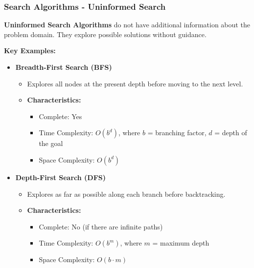 \documentclass[aspectratio=169]{beamer}
\begin{document}
\begin{frame}[fragile]
    \frametitle{Search Algorithms - Uninformed Search}
    \textbf{Uninformed Search Algorithms} do not have additional information about the problem domain. They explore possible solutions without guidance.

    \textbf{Key Examples:}
    
    \begin{itemize}
        \item \textbf{Breadth-First Search (BFS)}
        \begin{itemize}
            \item Explores all nodes at the present depth before moving to the next level.
            \item \textbf{Characteristics:}
            \begin{itemize}
                \item Complete: Yes
                \item Time Complexity: $O(b^d)$, where $b$ = branching factor, $d$ = depth of the goal
                \item Space Complexity: $O(b^d)$
            \end{itemize}
        \end{itemize}
        
        \item \textbf{Depth-First Search (DFS)}
        \begin{itemize}
            \item Explores as far as possible along each branch before backtracking.
            \item \textbf{Characteristics:}
            \begin{itemize}
                \item Complete: No (if there are infinite paths)
                \item Time Complexity: $O(b^m)$, where $m$ = maximum depth
                \item Space Complexity: $O(b \cdot m)$
            \end{itemize}
        \end{itemize}
    \end{itemize}
\end{frame}
\end{document}
